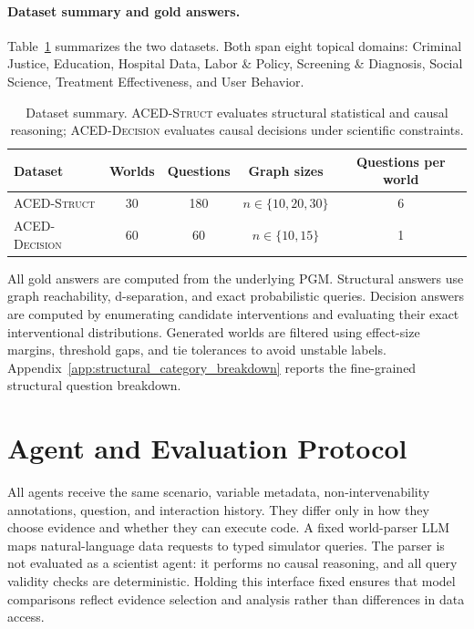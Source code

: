 \documentclass{article}
\newcommand{\pgmstruct}{\textsc{ACED-Struct} }
\newcommand{\pgmdecision}{\textsc{ACED-Decision} }
\begin{document}
\paragraph{Dataset summary and gold answers.}
Table~\ref{tab:dataset_summary} summarizes the two datasets.
Both span eight topical domains: Criminal Justice, Education, Hospital Data, Labor \& Policy, Screening \& Diagnosis, Social Science, Treatment Effectiveness, and User Behavior.

\begin{table}[t]
\centering
\small
\caption{
Dataset summary.
\pgmstruct evaluates structural statistical and causal reasoning; \pgmdecision evaluates causal decisions under scientific constraints.
}
\label{tab:dataset_summary}
\begin{tabular}{lcccc}
\toprule
Dataset & Worlds & Questions & Graph sizes & Questions per world \\
\midrule
\pgmstruct   & 30 & 180 & $n\in\{10,20,30\}$ & 6 \\
\pgmdecision & 60 & 60  & $n\in\{10,15\}$    & 1 \\
\bottomrule
\end{tabular}
\end{table}

All gold answers are computed from the underlying PGM.
Structural answers use graph reachability, d-separation, and exact probabilistic queries.
Decision answers are computed by enumerating candidate interventions and evaluating their exact interventional distributions.
Generated worlds are filtered using effect-size margins, threshold gaps, and tie tolerances to avoid unstable labels.
Appendix~\ref{app:structural_category_breakdown} reports the fine-grained structural question breakdown.

\section{Agent and Evaluation Protocol}
\label{sec:protocol}

All agents receive the same scenario, variable metadata, non-intervenability annotations, question, and interaction history.
They differ only in how they choose evidence and whether they can execute code.
A fixed world-parser LLM maps natural-language data requests to typed simulator queries.
The parser is not evaluated as a scientist agent: it performs no causal reasoning, and all query validity checks are deterministic.
Holding this interface fixed ensures that model comparisons reflect evidence selection and analysis rather than differences in data access.
\end{document}
